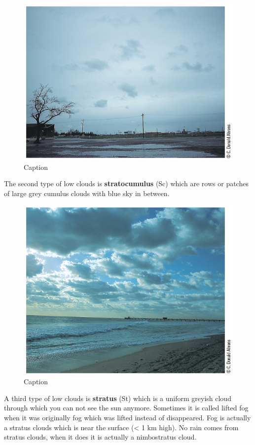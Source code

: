 \documentclass[12pt,oneside]{book}
\begin{document}
\begin{figure}

{\centering \includegraphics[width=0.8\linewidth]{figures/Figure251} 

}

\caption{Caption}\label{fig:CLOUD6}
\end{figure}

The second type of low clouds is \textbf{stratocumulus} (Sc) which are
rows or patches of large grey cumulus clouds with blue sky in between.

\begin{figure}

{\centering \includegraphics[width=0.8\linewidth]{figures/Figure252} 

}

\caption{Caption}\label{fig:CLOUD7}
\end{figure}

A third type of low clouds is \textbf{stratus} (St) which is a uniform
greyish cloud through which you can not see the sun anymore. Sometimes
it is called lifted fog when it was originally fog which was lifted
instead of disappeared. Fog is actually a stratus clouds which is near
the surface (\textless{} 1 km high). No rain comes from stratus clouds,
when it does it is actually a nimbostratus cloud.
\end{document}
